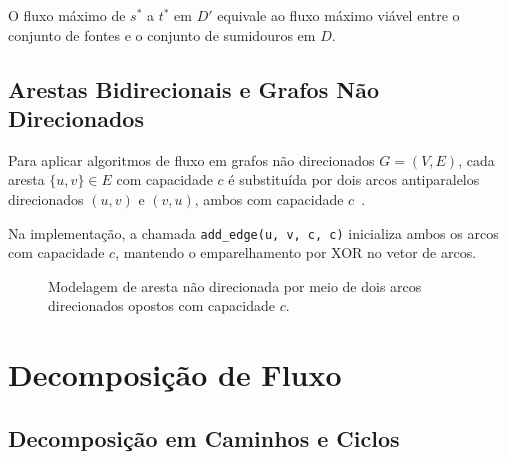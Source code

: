 O fluxo máximo de $s^*$ a $t^*$ em $D'$ equivale ao fluxo máximo viável entre o conjunto de fontes e o conjunto de sumidouros em $D$.


\subsection{Arestas Bidirecionais e Grafos Não Direcionados}

Para aplicar algoritmos de fluxo em grafos não direcionados $G = (V, E)$, cada aresta $\{u,v\} \in E$ com capacidade $c$ é substituída por dois arcos antiparalelos direcionados $(u,v)$ e $(v,u)$, ambos com capacidade $c$~\cite{ahuja1993network}.

Na implementação, a chamada \lstinline{add_edge(u, v, c, c)} inicializa ambos os arcos com capacidade $c$, mantendo o emparelhamento por XOR no vetor de arcos.

\begin{figure}[!ht]
\centering
{}
\caption{Modelagem de aresta não direcionada por meio de dois arcos direcionados opostos com capacidade $c$.}
\label{fig:arcos_bidirecionais}
\end{figure}


\section{Decomposição de Fluxo}\label{sec:decomposicao_cap}

\subsection{Decomposição em Caminhos e Ciclos}

